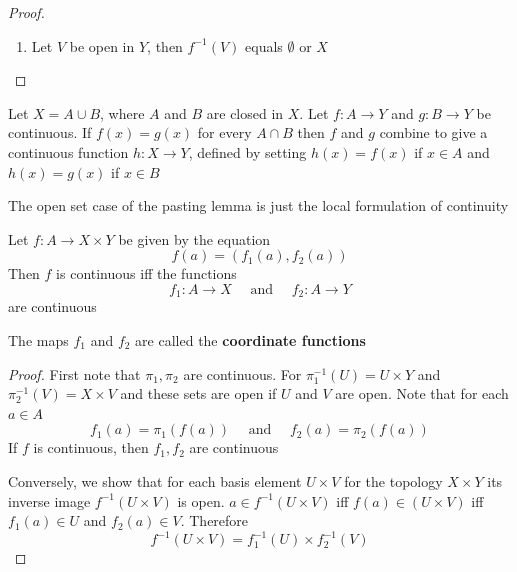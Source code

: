 \documentclass[11pt]{article}
\begin{document}
\begin{proof}
\begin{enumerate}
\item Let \(V\) be open in \(Y\), then \(f^{-1}(V)\) equals \(\emptyset\) or \(X\)
\end{enumerate}
\end{proof}

\begin{theorem}
Let \(X=A\cup B\), where \(A\) and \(B\) are closed in \(X\). Let \(f:A\to Y\) and \(g:B\to Y\) be
continuous. If \(f(x)=g(x)\) for every \(A\cap B\) then \(f\) and \(g\) combine to give a continuous
function \(h:X\to Y\), defined by setting \(h(x)=f(x)\) if \(x\in A\) and \(h(x)=g(x)\) if \(x\in B\)
\end{theorem}

The open set case of the pasting lemma is just the local formulation of continuity

\begin{theorem}
Let \(f:A\to X\times Y\) be given by the equation
\begin{equation*}
f(a)=(f_1(a),f_2(a))
\end{equation*}
Then \(f\) is continuous iff the functions
\begin{equation*}
f_1:A\to X \quad\text{ and }\quad f_2:A\to Y
\end{equation*}
are continuous

The maps \(f_1\) and \(f_2\) are called the \textbf{coordinate functions}
\end{theorem}

\begin{proof}
First note that \(\pi_1,\pi_2\) are continuous. For \(\pi_1^{-1}(U)=U\times Y\) and \(\pi_2^{-1}(V)=X\times V\) and
these sets are open if \(U\) and \(V\) are open. Note that for each \(a\in A\)
\begin{equation*}
f_1(a)=\pi_1(f(a))\quad\text{ and }\quad f_2(a)=\pi_2(f(a))
\end{equation*}
If \(f\) is continuous, then \(f_1,f_2\) are continuous

Conversely, we show that for each basis element \(U\times V\) for the topology \(X\times Y\) its inverse
image \(f^{-1}(U\times V)\) is open. \(a\in f^{-1}(U\times V)\) iff \(f(a)\in(U\times V)\) iff \(f_1(a)\in U\)
and \(f_2(a)\in V\). Therefore
\begin{equation*}
f^{-1}(U\times V)=f_1^{-1}(U)\times f_2^{-1}(V)
\end{equation*}
\end{proof}
\end{document}
